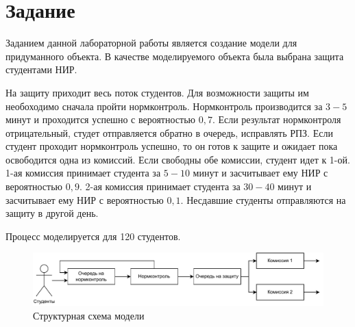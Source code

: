 \chapter*{Задание}
Заданием данной лабораторной работы является создание модели для придуманного объекта. В качестве моделируемого объекта была выбрана защита студентами НИР.

На защиту приходит весь поток студентов. Для возможности защиты им необоходимо сначала пройти нормконтроль. Нормконтроль производится за $3-5$ минут и проходится успешно с вероятностью $0,7$. Если результат нормконтроля отрицательный, студет отправляется обратно в очередь, исправлять РПЗ. Если студент проходит нормконтроль успешно, то он готов к защите и ожидает пока освободится одна из комиссий. Если свободны обе комиссии, студент идет к 1-ой. 1-ая комиссия принимает студента за $5-10$ минут и засчитывает ему НИР с вероятностью $0,9$. 2-ая комиссия принимает студента за $30-40$ минут и засчитывает ему НИР с вероятностью $0,1$. Несдавшие студенты отправляются на защиту в другой день.

Процесс моделируется для 120 студентов.

\begin{figure}[h]
	\includegraphics[width=1\linewidth]{"inc/img/Структурная модель.drawio.pdf"}
	\caption{Структурная схема модели}
	\label{s1}
\end{figure}